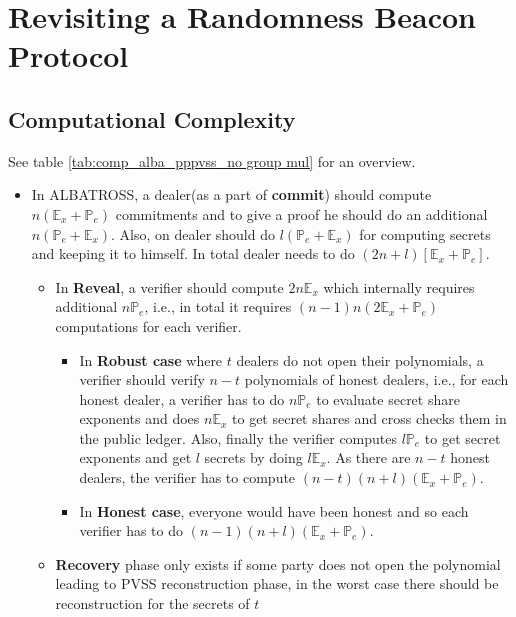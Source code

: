 \chapter{Revisiting a Randomness Beacon Protocol}
\label{cha:n}


\section{Computational Complexity}

See table \ref{tab:comp_alba_pppvss_no group mul} for an overview.
\begin{itemize}
    \item In ALBATROSS, a dealer(as a part of \textbf{commit}) should compute $n(\mathbb{E}_x+\mathbb{P}_e)$ commitments and to give a proof he should do an additional $n(\mathbb{P}_{e}+\mathbb{E}_{x})$. Also, on dealer should do $l(\mathbb{P}_e+\mathbb{E}_x)$ for computing secrets and keeping it to himself. In total dealer needs to do $(2n+l)[\mathbb{E}_x+\mathbb{P}_{e}]$.
        \begin{itemize}
            \item In \textbf{Reveal}, a verifier should compute $2n\mathbb{E}_{x}$ which internally requires additional $n\mathbb{P}_{e}$, i.e., in total it requires $(n-1)n(2\mathbb{E}_{x}+\mathbb{P}_{e})$ computations for each verifier.
            \begin{itemize}
                \item In \textbf{Robust case} where $t$ dealers do not open their polynomials, a verifier should verify $n-t$ polynomials of honest dealers, i.e., for each honest dealer, a verifier has to do $n\mathbb{P}_e$ to evaluate secret share exponents and does $n\mathbb{E}_x$ to get secret shares and cross checks them in the public ledger. Also, finally the verifier computes $l\mathbb{P}_e$ to get secret exponents and get $l$ secrets by doing $l\mathbb{E}_x$. As there are $n-t$ honest dealers, the verifier has to compute $(n-t)(n+l)(\mathbb{E}_x+\mathbb{P}_e)$.
                \item  In \textbf{Honest case}, everyone would have been honest and so each verifier has to do $(n-1)(n+l)(\mathbb{E}_x+\mathbb{P}_e)$.
            \end{itemize}
            \item \textbf{Recovery} phase only exists if some party does not 
            open the polynomial leading to PVSS reconstruction phase, in the 
            worst case there should be reconstruction for the secrets of $t$ 

\end{itemize}
\end{itemize}
